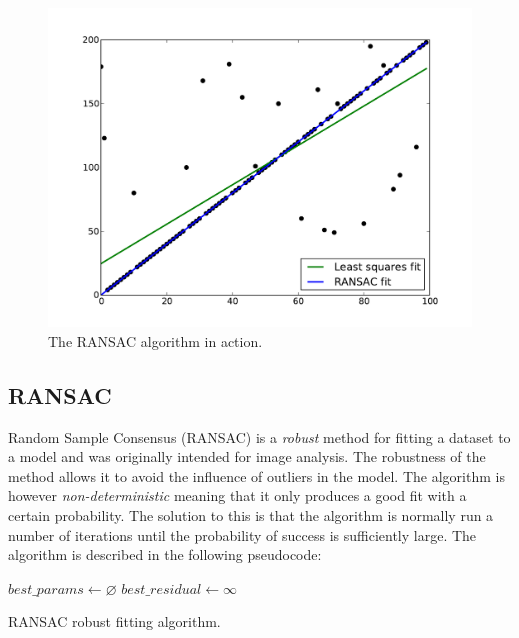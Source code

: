 \documentclass[a4paper]{report}
\begin{document}
\begin{figure}[t]
    \includegraphics[width=\linewidth]{ransac}
    \caption{The RANSAC algorithm in action.}
    \label{fig:ransac}
\end{figure}

\subsection{RANSAC}
Random Sample Consensus (RANSAC) is a \emph{robust} method for fitting a
dataset to a model and was originally intended for image
analysis\cite{fischler81}. The robustness of the method allows it to avoid the
influence of outliers in the model. The algorithm is however
\emph{non-deterministic} meaning that it only produces a good fit with a
certain probability. The solution to this is that the algorithm is normally
run a number of iterations until the probability of success is sufficiently
large. The algorithm is described in the following pseudocode:

\begin{algorithm}[H]
    \DontPrintSemicolon
    \BlankLine
    $best\_params \gets \varnothing$\;
    $best\_residual \gets \infty$\;
    \caption{RANSAC robust fitting algorithm.}
    \label{alg:ransac}
\end{algorithm}
\end{document}
